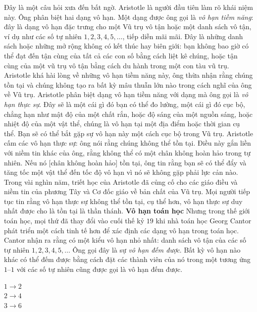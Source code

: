 \begin{multicols}{2}	
	Đây là một câu hỏi xưa đến bất ngờ. Aristotle là người đầu tiên làm rõ khái
	niệm này. Ông phân biệt hai dạng vô hạn. Một dạng được ông gọi là \textit{vô
	hạn tiềm năng}: đây là dạng vô hạn đặc trưng cho một Vũ trụ vô tận hoặc một
	danh sách vô tận, ví dụ như các số tự nhiên $1,2,3,4,5, \ldots$, tiếp diễn mãi
	mãi. Đây là những danh sách hoặc những mở rộng không có kết thúc hay biên
	giới: bạn không bao giờ có thể đạt đến tận cùng của tất cả các con số bằng
	cách liệt kê chúng, hoặc tận cùng của một vũ trụ vô tận bằng cách du hành trong
	một con tàu vũ trụ. Aristotle khá hài lòng về những vô hạn tiềm năng này, ông
	thừa nhận rằng chúng tồn tại và chúng không tạo ra bất kỳ mâu thuẫn lớn nào
	trong cách nghĩ của ông về Vũ trụ.
	\vskip 0.01cm
	Aristotle phân biệt dạng vô hạn tiềm năng với dạng mà ông gọi là \textit{vô
	hạn thực sự}. Đây sẽ là một cái gì đó bạn có thể đo lường, một cái gì đó cục
	bộ, chẳng hạn như mật độ của một chất rắn, hoặc độ sáng của một nguồn sáng, hoặc
	nhiệt độ của một vật thể, chúng là vô hạn tại một địa điểm hoặc thời gian cụ
	thể. Bạn sẽ có thể bắt gặp sự vô hạn này một cách cục bộ trong Vũ trụ. Aristotle cấm
	các vô hạn thực sự: ông nói rằng chúng không thể tồn tại. Điều này gắn liền
	với niềm tin khác của ông, rằng không thể có một chân không hoàn hảo trong tự
	nhiên. Nếu nó [chân không hoàn hảo] tồn tại, ông tin rằng bạn sẽ có thể đẩy và
	tăng tốc một vật thể đến tốc độ vô hạn vì nó sẽ không gặp phải lực cản nào.
	\vskip 0.1cm
	Trong vài nghìn năm, triết học của Aristotle đã củng cố cho các giáo điều và
	niềm tin của phương Tây và Cơ đốc giáo về bản chất của Vũ trụ. Mọi người tiếp
	tục tin rằng vô hạn thực sự không thể tồn tại, cụ thể hơn, vô hạn thực sự duy
	nhất được cho là tồn tại là thần thánh.
	\vskip 0.1cm
	\textbf{\color{quantoan}Vô hạn toán học}
	\vskip 0.1cm 
	Nhưng trong thế giới toán học, mọi thứ đã thay đổi vào cuối thế kỷ $19$ khi nhà
	toán học Georg Cantor phát triển một cách tinh tế hơn để xác định các dạng vô
	hạn trong toán học. Cantor nhận ra rằng có một kiểu vô hạn nhỏ nhất: danh sách
	vô tận của các số tự nhiên $1,2,3,4,5, \ldots$ Ông gọi đây là sự \textit{vô
		hạn đếm được}. Bất kỳ vô hạn nào khác có thể đếm được bằng cách đặt các
	thành viên của nó trong một tương ứng $1$--$1$ với các số tự nhiên cũng được gọi là
	vô hạn đếm được.
	\begin{center}
		$1 \longrightarrow 2$\\
		$2 \longrightarrow 4$\\
		$3 \longrightarrow 6$\\

\end{center}
\end{multicols}
